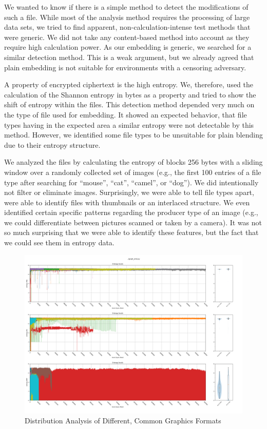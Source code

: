 We wanted to know if there is a simple method to detect the modifications of such a file. While most of the analysis method requires the processing of large data sets, we tried to find apparent, non-calculation-intense test methods that were generic. We did not take any content-based method into account as they require high calculation power. As our embedding is generic, we searched for a similar detection method. This is a weak argument, but we already agreed that plain embedding is not suitable for environments with a censoring adversary.

A property of encrypted ciphertext is the high entropy. We, therefore, used the calculation of the Shannon entropy in bytes as a property and tried to show the shift of entropy within the files. This detection method depended very much on the type of file used for embedding. It showed an expected behavior, that file types having in the expected area a similar entropy were not detectable by this method. However, we identified some file types to be unsuitable for plain blending due to their entropy structure.

We analyzed the files by calculating the entropy of blocks 256 bytes with a sliding window over a randomly collected set of images (e.g., the first 100 entries of a file type after searching for ``mouse'', ``cat'', ``camel'', or ``dog''). We did intentionally not filter or eliminate images. Surprisingly, we were able to tell file types apart, were able to identify files with thumbnails or an interlaced structure. We even identified certain specific patterns regarding the producer type of an image (e.g., we could differentiate between pictures scanned or taken by a camera). It was not so much surprising that we were able to identify these features, but the fact that we could see them in entropy data.

\begin{figure}[ht]
	\includegraphics[width=\textwidth]{inc/statanalysis_graph}
	\caption{Distribution Analysis of Different, Common Graphics Formats}
	\label{fig:statGraph}
\end{figure}

